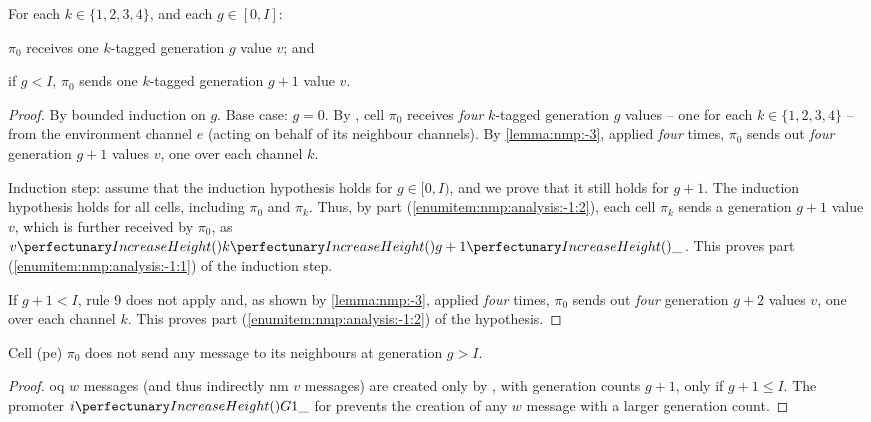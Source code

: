 \begin{theorem}\label{theorem:nmp:-1}
    For each $k \in \{ 1, 2, 3, 4 \}$, and each $g \in [0, I]$:
    \begin{inparaenum}[(i)]
        \item\label{enumitem:nmp:analysis:-1:1} $\pi_0$ receives one $k$-tagged generation $g$ value $v$; and
        \item\label{enumitem:nmp:analysis:-1:2} if $g < I$, $\pi_0$ sends one $k$-tagged generation $g+1$ value $v$.
    \end{inparaenum}
\end{theorem}

\begin{proof}
By bounded induction on $g$. Base case: $g = 0$. By , cell $\pi_0$ receives \emph{four} $k$-tagged generation $g$ values -- one for each $k \in \{ 1, 2, 3, 4 \}$ -- from the environment channel $e$ (acting on behalf of its neighbour channels). By \cref{lemma:nmp:-3}, applied \emph{four} times, $\pi_0$ sends out \emph{four} generation $g+1$ values $v$, one over each channel $k$.

Induction step: assume that the induction hypothesis holds for 
$g \in [0, I)$, and we prove that it still holds for $g+1$.
The induction hypothesis holds for all cells, 
including $\pi_0$ and $\pi_k$. 
Thus, by part (\ref{enumitem:nmp:analysis:-1:2}), each cell $\pi_k$ sends a generation $g+1$ value $v$, 
which is further received by $\pi_0$, as $\cpvv{k}{g+1}{\cpdiscard}$.
This proves part (\ref{enumitem:nmp:analysis:-1:1}) of the induction step.

If $g+1 < I$, rule 9 does not apply and, 
as shown by \cref{lemma:nmp:-3}, applied \emph{four} times, 
$\pi_0$ sends out \emph{four} generation $g+2$ values $v$, one over each channel $k$.
This proves part (\ref{enumitem:nmp:analysis:-1:2}) of the hypothesis.
\end{proof}

\begin{theorem}\label{theorem:nmp:-2}
    Cell (\gls{pe}) \(\pi_0\) does not send any message to its neighbours at generation \(g > I\).
\end{theorem}

\begin{proof}
    \Gls{oq} \(w\) messages (and thus indirectly \gls{nm} \(v\) messages) are created only by , with generation counts \(g + 1\), only if \(g + 1 \leq I\).  The promoter \(\cpfunc{i}{G1\cpdiscard}\) for  prevents the creation of any \(w\) message with a larger generation count.
\end{proof}

